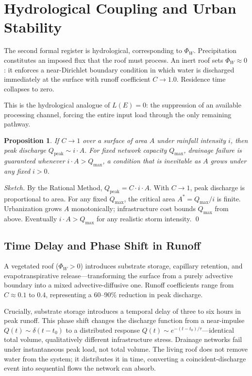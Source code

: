 \documentclass[12pt, a4paper]{article}
\theoremstyle{plain}
\newtheorem{proposition}{Proposition}
\theoremstyle{remark}
\begin{document}
\section{Hydrological Coupling and Urban Stability}

The second formal register is hydrological, corresponding to $\Phi_W$. Precipitation constitutes an imposed flux that the roof must process. An inert roof sets $\Phi_W \approx 0$: it enforces a near-Dirichlet boundary condition in which water is discharged immediately at the surface with runoff coefficient $C \to 1.0$. Residence time collapses to zero.

This is the hydrological analogue of $L(E) = 0$: the suppression of an available processing channel, forcing the entire input load through the only remaining pathway.

\begin{proposition}
\label{prop:hydro}
If\/ $C \to 1$ over a surface of area $A$ under rainfall intensity $i$, then peak discharge $Q_{\mathrm{peak}} \sim i \cdot A$. For fixed network capacity $Q_{\max}$, drainage failure is guaranteed whenever $i \cdot A > Q_{\max}$, a condition that is inevitable as $A$ grows under any fixed $i > 0$.
\end{proposition}

\begin{proof}[Sketch]
By the Rational Method, $Q_{\mathrm{peak}} = C \cdot i \cdot A$. With $C \to 1$, peak discharge is proportional to area. For any fixed $Q_{\max}$, the critical area $A^* = Q_{\max}/i$ is finite. Urbanization grows $A$ monotonically; infrastructure cost bounds $Q_{\max}$ from above. Eventually $i \cdot A > Q_{\max}$ for any realistic storm intensity. \qed
\end{proof}

\subsection{Time Delay and Phase Shift in Runoff}

A vegetated roof ($\Phi_W > 0$) introduces substrate storage, capillary retention, and evapotranspirative release---transforming the surface from a purely advective boundary into a mixed advective-diffusive one. Runoff coefficients range from $C \approx 0.1$ to $0.4$, representing a 60--90\% reduction in peak discharge.

Crucially, substrate storage introduces a temporal delay of three to six hours in peak runoff. This phase shift changes the discharge function from a near-impulse $Q(t) \sim \delta(t-t_0)$ to a distributed response $Q(t) \sim e^{-(t-t_0)/\tau}$---identical total volume, qualitatively different infrastructure stress. Drainage networks fail under instantaneous peak load, not total volume. The living roof does not remove water from the system; it distributes it in time, converting a coincident-discharge event into sequential flows the network can absorb.
\end{document}

